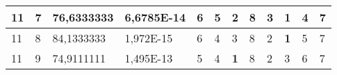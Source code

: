 \documentclass[conference]{IEEEtran}
\begin{document}
\begin{table*}[]
\begin{tabular}{|llll|llllllll|}
\multicolumn{1}{|l|}{11}                                                    & \multicolumn{1}{l|}{7}                                                        & \multicolumn{1}{l|}{76,6333333}                                                   & 6,6785E-14                     & \multicolumn{1}{l|}{6}                                                  & \multicolumn{1}{l|}{5}                                                  & \multicolumn{1}{l|}{2}                                                  & \multicolumn{1}{l|}{8}                                                  & \multicolumn{1}{l|}{3}                                                  & \multicolumn{1}{l|}{\textbf{1}}                                         & \multicolumn{1}{l|}{4}                                                  & 7                          \\ \hline
\multicolumn{1}{|l|}{11}                                                    & \multicolumn{1}{l|}{8}                                                        & \multicolumn{1}{l|}{84,1333333}                                                   & 1,972E-15                      & \multicolumn{1}{l|}{6}                                                  & \multicolumn{1}{l|}{4}                                                  & \multicolumn{1}{l|}{3}                                                  & \multicolumn{1}{l|}{8}                                                  & \multicolumn{1}{l|}{2}                                                  & \multicolumn{1}{l|}{\textbf{1}}                                         & \multicolumn{1}{l|}{5}                                                  & 7                          \\ \hline
\multicolumn{1}{|l|}{11}                                                    & \multicolumn{1}{l|}{9}                                                        & \multicolumn{1}{l|}{74,9111111}                                                   & 1,495E-13                      & \multicolumn{1}{l|}{5}                                                  & \multicolumn{1}{l|}{4}                                                  & \multicolumn{1}{l|}{\textbf{1}}                                         & \multicolumn{1}{l|}{8}                                                  & \multicolumn{1}{l|}{2}                                                  & \multicolumn{1}{l|}{3}                                                  & \multicolumn{1}{l|}{6}                                                  & 7                          \\ \hline

\end{tabular}
\end{table*}
\end{document}
